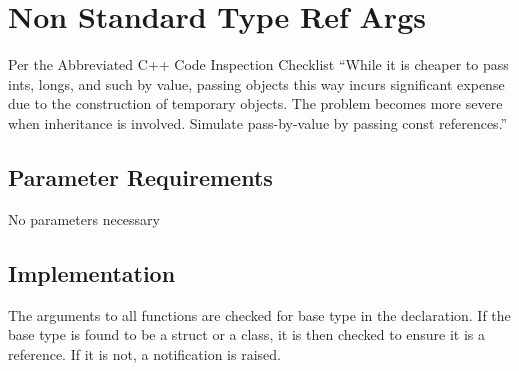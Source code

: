 %
%

\section{Non Standard Type Ref Args}
\label{NonStandardTypeRefArgs::overview}

Per the Abbreviated C++ Code Inspection Checklist ``While it is
cheaper to pass ints, longs, and such by value, passing objects this
way incurs significant expense due to the construction of temporary
objects. The problem becomes more severe when inheritance is
involved. Simulate pass-by-value by passing const references.''

\subsection{Parameter Requirements}

No parameters necessary

\subsection{Implementation}

The arguments to all functions are checked for base type in the
declaration.  If the base type is found to be a struct or a class, it
is then checked to ensure it is a reference.  If it is not, a
notification is raised.

